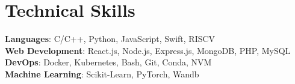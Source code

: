 \section{Technical Skills}
    \begin{itemize}[leftmargin=0.15in, label={}]
	\small{\item{
		\textbf{Languages}{: C/C++, Python, JavaScript, Swift, RISCV} \\
		\textbf{Web Development}{: React.js, Node.js, Express.js, MongoDB, PHP, MySQL} \\
		\textbf{DevOps}{: Docker, Kubernetes, Bash, Git, Conda, NVM} \\
		\textbf{Machine Learning}{: Scikit-Learn, PyTorch, Wandb} \\
	}}
    \end{itemize}
